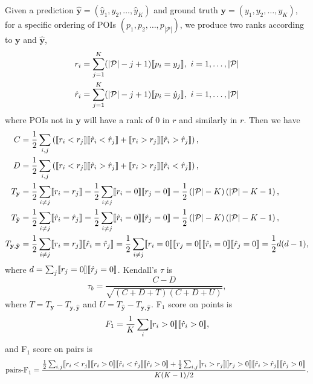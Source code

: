 Given a prediction $\hat{\mathbf{y}} = (\hat{y}_1, \hat{y}_2, \dots, \hat{y}_K)$ and ground truth $\mathbf{y} = (y_1, y_2, \dots, y_K)$,
for a specific ordering of POIs $(p_1, p_2, \dots, p_{|\mathcal{P}|})$,
we produce two ranks according to $\mathbf{y}$ and $\hat{\mathbf{y}}$,
\begin{align*}
r_i       &= \sum_{j=1}^K (| \mathcal{P} | - j + 1)  \llbracket p_i = y_j \rrbracket,~
i = 1, \dots, | \mathcal{P} | \\
\hat{r}_i &= \sum_{j=1}^K (| \mathcal{P} | - j + 1)  \llbracket p_i = \hat{y}_j \rrbracket,~ 
i = 1, \dots, | \mathcal{P} |
\end{align*}
where POIs not in $\mathbf{y}$ will have a rank of $0$ in $r$ and similarly in $r$.
Then we have
\begin{align*}
C &= \frac{1}{2} \sum_{i,j} \left(\llbracket r_i < r_j \rrbracket  \llbracket \hat{r}_i < \hat{r}_j \rrbracket +
     \llbracket r_i > r_j \rrbracket  \llbracket \hat{r}_i > \hat{r}_j \rrbracket \right), \\
D &= \frac{1}{2} \sum_{i,j} \left(\llbracket r_i < r_j \rrbracket  \llbracket \hat{r}_i > \hat{r}_j \rrbracket +
     \llbracket r_i > r_j \rrbracket  \llbracket \hat{r}_i < \hat{r}_j \rrbracket \right), \\
T_{\mathbf{y}} &= \frac{1}{2} \sum_{i \ne j} \llbracket r_i = r_j \rrbracket 
                = \frac{1}{2} \sum_{i \ne j} \llbracket r_i = 0 \rrbracket  \llbracket r_j = 0 \rrbracket 
                = \frac{1}{2} \left( |\mathcal{P}| - K \right) \left( |\mathcal{P}| - K - 1 \right), \\ 
T_{\hat{\mathbf{y}}} &= \frac{1}{2} \sum_{i \ne j} \llbracket \hat{r}_i = \hat{r}_j \rrbracket
                      = \frac{1}{2} \sum_{i \ne j} \llbracket \hat{r}_i = 0 \rrbracket  \llbracket \hat{r}_j = 0 \rrbracket
                      = \frac{1}{2} \left( |\mathcal{P}| - K \right) \left( |\mathcal{P}| - K - 1 \right), \\ 
T_{\mathbf{y},\hat{\mathbf{y}}} &= \frac{1}{2} \sum_{i \ne j} \llbracket r_i = r_j \rrbracket  \llbracket \hat{r}_i = \hat{r}_j \rrbracket
                                 = \frac{1}{2} \sum_{i \ne j} \llbracket r_i = 0 \rrbracket  \llbracket r_j = 0 \rrbracket 
                                   \llbracket \hat{r}_i = 0 \rrbracket  \llbracket \hat{r}_j = 0 \rrbracket
                                 = \frac{1}{2} {d(d-1)},
\end{align*}
where $d = \sum_j \llbracket r_j = 0 \rrbracket  \llbracket \hat{r}_j = 0 \rrbracket$.
Kendall's $\tau$ is
\begin{equation*}
\tau_b = \frac{C - D}{\sqrt{(C + D + T) (C + D + U)}},
\end{equation*}
where $T = T_{\mathbf{y}} - T_{\mathbf{y},\hat{\mathbf{y}}}$ and $U = T_{\hat{\mathbf{y}}} - T_{\mathbf{y},\hat{\mathbf{y}}}$.
F$_1$ score on points is
\begin{equation*}
F_1 = \frac{1}{K} \sum_i \llbracket r_i > 0 \rrbracket  \llbracket \hat{r}_i > 0 \rrbracket,
\end{equation*}
and F$_1$ score on pairs is
\begin{equation*}
\text{pairs-F}_1 = \frac{\frac{1}{2} \sum_{i,j} 
                   \llbracket r_i < r_j \rrbracket  \llbracket r_i > 0 \rrbracket 
                   \llbracket \hat{r}_i < \hat{r}_j \rrbracket  \llbracket \hat{r}_i > 0 \rrbracket +
                   \frac{1}{2} \sum_{i,j} 
                   \llbracket r_i > r_j \rrbracket  \llbracket r_j > 0 \rrbracket 
                   \llbracket \hat{r}_i > \hat{r}_j \rrbracket  \llbracket \hat{r}_j > 0 \rrbracket}{K(K-1)/2}.
\end{equation*}

